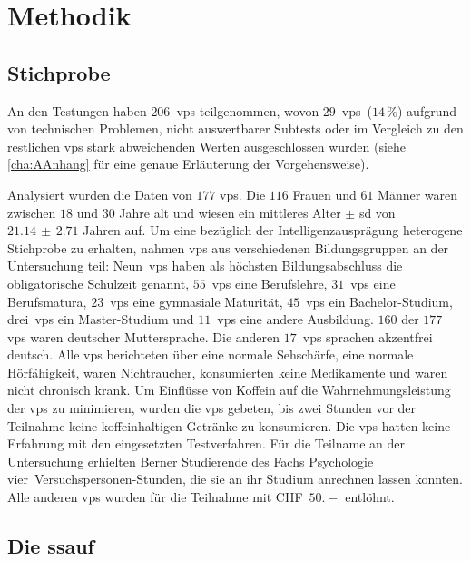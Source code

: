 \documentclass[11pt, twoside, a4paper]{book}		%
\begin{document}
\chapter{Methodik \label{cha:Methodik}}

\section{Stichprobe \label{sec:Stichprobe}}

An den Testungen haben $206$~\glspl{vp} teilgenommen, wovon $29$~\glspl{vp}~($14\,\%$) aufgrund von technischen Problemen, nicht auswertbarer Subtests oder im Vergleich zu den
 restlichen \glspl{vp} stark abweichenden Werten ausgeschlossen wurden (siehe \autoref{cha:AAnhang} für eine genaue Erläuterung der Vorgehensweise).

Analysiert wurden die Daten von $177$ \glspl{vp}. Die $116$ Frauen und $61$ Männer waren zwischen $18$ und $30$ Jahre alt und wiesen ein mittleres Alter $\pm$ \gls{sd} von $21.14\,\pm\,2.71$ Jahren auf. 
Um eine bezüglich der Intelligenzausprägung heterogene Stichprobe zu erhalten, nahmen \glspl{vp} aus verschiedenen Bildungsgruppen an der Untersuchung teil:
Neun~\glspl{vp} haben als höchsten Bildungsabschluss die obligatorische Schulzeit genannt,
$55$~\glspl{vp} eine Berufslehre,
$31$~\glspl{vp} eine Berufsmatura,
$23$~\glspl{vp} eine gymnasiale Maturität,
$45$~\glspl{vp} ein Bachelor-Studium,
drei~\glspl{vp} ein Master-Studium und 
$11$~\glspl{vp} eine andere Ausbildung.
$160$ der $177$ \glspl{vp} waren deutscher Muttersprache. Die anderen $17$~\glspl{vp} sprachen akzentfrei deutsch. Alle \glspl{vp} berichteten über eine normale Sehschärfe, eine normale Hörfähigkeit, waren Nichtraucher, konsumierten keine Medikamente und waren nicht chronisch krank. Um Einflüsse von Koffein auf die Wahrnehmungsleistung \citep[][]{Stough1995} der \glspl{vp} zu minimieren, wurden die \glspl{vp} gebeten, bis zwei Stunden vor der Teilnahme keine koffeinhaltigen Getränke zu konsumieren. Die \glspl{vp} hatten keine Erfahrung mit den eingesetzten Testverfahren. 
Für die Teilname an der Untersuchung erhielten Berner Studierende des Fachs Psychologie vier~Ver\-suchs\-per\-sonen-Stun\-den, die sie an ihr Studium anrechnen lassen konnten. Alle anderen \glspl{vp} wurden für die Teilnahme mit CHF~$50.-$ entlöhnt.




\section{Die \gls{ssauf} \label{sec:}}
\end{document}
